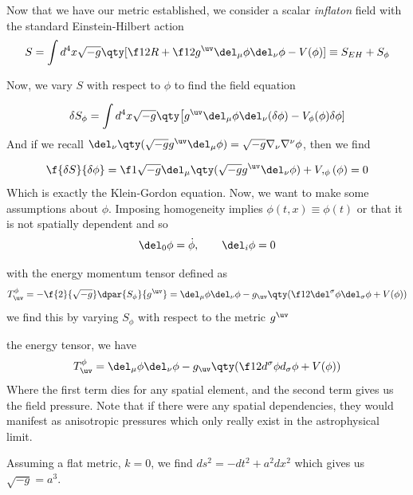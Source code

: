 

Now that we have our metric established, we consider a scalar \textit{inflaton} field with the standard Einstein-Hilbert action
\begin{equation}
    S=\int d^4x \sqrt{-g}\qty[\f12 R +\f12 g^{\uv}\del_\mu\phi\del_\nu\phi-V(\phi)]\equiv S_{EH}+S_\phi
\end{equation}

Now, we vary $S$ with respect to $\phi$ to find the field equation

\begin{equation}
    \delta S_\phi=\int d^4x\sqrt{-g}\qty\big[g^{\uv}\del_\mu\phi\del_\nu(\delta\phi)- V_\phi(\phi)\delta\phi]
\end{equation}
And if we recall $\del_\nu\qty(\sqrt{-g}g^{\uv}\del_\mu\phi)=\sqrt{-g}\nabla_\nu\nabla^\nu\phi$, then we find

\begin{equation}
    \f{\delta S}{\delta\phi}=\f1{\sqrt{-g}}\del_\mu\qty(\sqrt{-g}g^{\uv}\del_\nu\phi)+V,_\phi(\phi)=0
\end{equation}
Which is exactly the Klein-Gordon equation. Now, we want to make some assumptions about $\phi$. Imposing homogeneity implies $\phi(t,x)\equiv \phi(t)$ or that it is not spatially dependent and so
\begin{equation}
    \del_0\phi=\dot {\phi}, \qquad \del_i\phi=0 
\end{equation}



with the energy momentum tensor defined as
\begin{equation}
    T^\phi_{\uv}=-\f{2}{\sqrt{-g}}\dpar{S_\phi}{g^{\uv}}=\del_\mu\phi\del_\nu\phi-g_{\uv}\qty(\f12 \del^\sigma\phi\del_\sigma\phi+V(\phi))
\end{equation}
we find this by varying $S_\phi$ with respect to the metric $g^{\uv}$


 the energy tensor, we have 
\begin{equation}
    T^\phi_{\uv}=\del_\mu\phi\del_\nu\phi-g_{\uv}\qty(\f12 d^\sigma\phi d_\sigma\phi+V(\phi))
\end{equation}
Where the first term dies for any spatial element, and the second term gives us the field pressure. Note that if there were any spatial dependencies, they would manifest as anisotropic pressures which only really exist in the astrophysical limit. 

Assuming a flat metric, $k=0$, we find $ds^2=-dt^2+a^2dx^2$ which gives us $\sqrt{-g}=a^3$. 

